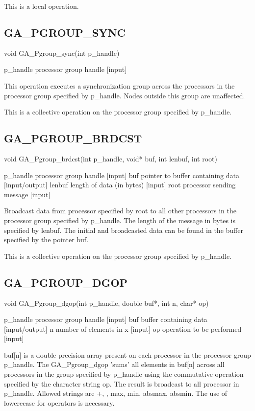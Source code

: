 This is a local operation. 


\subsection*{GA\_PGROUP\_SYNC}

void GA\_Pgroup\_sync(int p\_handle)

p\_handle processor group handle {[}input{]}

This operation executes a synchronization group across the processors
in the processor group specified by p\_handle. Nodes outside this
group are unaffected.

This is a collective operation on the processor group specified by
p\_handle. 


\subsection*{GA\_PGROUP\_BRDCST}

void GA\_Pgroup\_brdcst(int p\_handle, void{*} buf, int lenbuf, int
root)

p\_handle processor group handle {[}input{]} buf pointer to buffer
containing data {[}input/output{]} lenbuf length of data (in bytes)
{[}input{]} root processor sending message {[}input{]}

Broadcast data from processor specified by root to all other processors
in the processor group specified by p\_handle. The length of the message
in bytes is specified by lenbuf. The initial and broadcasted data
can be found in the buffer specified by the pointer buf.

This is a collective operation on the processor group specified by
p\_handle. 


\subsection*{GA\_PGROUP\_DGOP}

void GA\_Pgroup\_dgop(int p\_handle, double buf{*}, int n, char{*}
op)

p\_handle processor group handle {[}input{]} buf buffer containing
data {[}input/output{]} n number of elements in x {[}input{]} op operation
to be performed {[}input{]}

buf{[}n{]} is a double precision array present on each processor in
the processor group p\_handle. The GA\_Pgroup\_dgop 'sums' all elements
in buf{[}n{]} across all processors in the group specified by p\_handle
using the commutative operation specified by the character string
op. The result is broadcast to all processor in p\_handle. Allowed
strings are \textquotedbl{}+\textquotedbl{}, \textquotedbl{}{*}\textquotedbl{},
\textquotedbl{}max\textquotedbl{}, \textquotedbl{}min\textquotedbl{},
\textquotedbl{}absmax\textquotedbl{}, \textquotedbl{}absmin\textquotedbl{}.
The use of lowerecase for operators is necessary.

